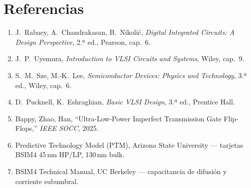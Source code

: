 \documentclass[11pt,a4paper]{article}
\begin{document}
\section{Referencias}
\begin{enumerate}[nosep,leftmargin=*]
\item J.\ Rabaey, A.\ Chandrakasan, B.\ Nikolić, \emph{Digital Integrated Circuits: A Design Perspective}, 2.ª ed., Pearson, cap.~6.
\item J.\ P.\ Uyemura, \emph{Introduction to VLSI Circuits and Systems}, Wiley, cap.~9.
\item S.\ M.\ Sze, M.-K.\ Lee, \emph{Semiconductor Devices: Physics and Technology}, 3.ª ed., Wiley, cap.~6.
\item D.\ Pucknell, K.\ Eshraghian, \emph{Basic VLSI Design}, 3.ª ed., Prentice Hall.
\item Bappy, Zhao, Han, ``Ultra-Low-Power Imperfect Transmission Gate Flip-Flops,'' \emph{IEEE SOCC}, 2025.
\item Predictive Technology Model (PTM), Arizona State University — tarjetas BSIM4 45\,nm HP/LP, 130\,nm bulk.
\item BSIM4 Technical Manual, UC Berkeley — capacitancia de difusión y corriente subumbral.
\end{enumerate}
\end{document}
